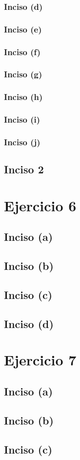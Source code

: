 \documentclass[a4paper,12pt]{article}
\begin{document}
            \subsubsection*{Inciso (d)}
            \subsubsection*{Inciso (e)}
            \subsubsection*{Inciso (f)}
            \subsubsection*{Inciso (g)}
            \subsubsection*{Inciso (h)}
            \subsubsection*{Inciso (i)}
            \subsubsection*{Inciso (j)}
        \subsection*{Inciso 2}

    \section*{Ejercicio 6}
        \subsection*{Inciso (a)}
        \subsection*{Inciso (b)}
        \subsection*{Inciso (c)}
        \subsection*{Inciso (d)}

    \section*{Ejercicio 7}
        \subsection*{Inciso (a)}
        \subsection*{Inciso (b)}
        \subsection*{Inciso (c)}
        
\end{document}
